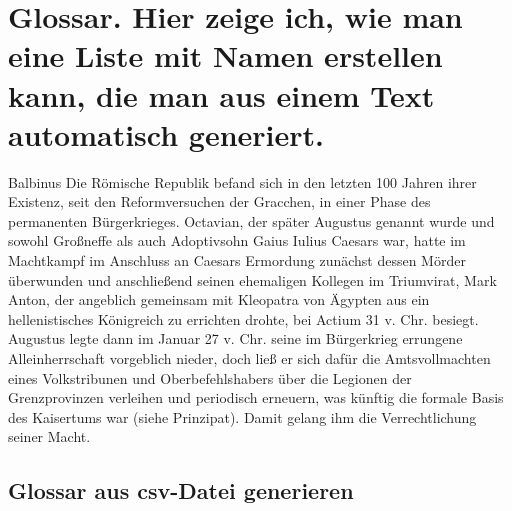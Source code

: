 
\chapter[Glossar]{Glossar. Hier zeige ich, wie man eine Liste mit Namen erstellen kann, die man aus einem Text automatisch generiert.}

\gls{Balbinus}
Die Römische Republik befand sich in den letzten 100 Jahren ihrer Existenz, seit den Reformversuchen der Gracchen, in einer Phase des permanenten Bürgerkrieges. Octavian, der später \gls{Augustus} genannt wurde und sowohl Großneffe als auch Adoptivsohn Gaius Iulius Caesars war, hatte im Machtkampf im Anschluss an Caesars Ermordung zunächst dessen Mörder überwunden und anschließend seinen ehemaligen Kollegen im Triumvirat, Mark Anton, der angeblich gemeinsam mit Kleopatra von Ägypten aus ein hellenistisches Königreich zu errichten drohte, bei Actium 31 v. Chr. besiegt. \gls{Augustus} legte dann im Januar 27 v. Chr. seine im Bürgerkrieg errungene Alleinherrschaft vorgeblich nieder, doch ließ er sich dafür die Amtsvollmachten eines Volkstribunen und Oberbefehlshabers über die Legionen der Grenzprovinzen verleihen und periodisch erneuern, was künftig die formale Basis des Kaisertums war (siehe Prinzipat). Damit gelang ihm die Verrechtlichung seiner Macht.


\printglossary[
title={Liste der römischen Kaiser},
style = index]%

\section{Glossar aus csv-Datei generieren}


